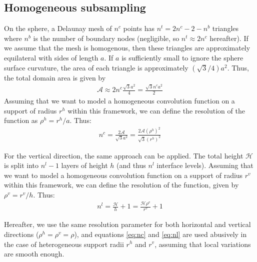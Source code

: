 \documentclass[12pt]{scrartcl}
\begin{document}
\subsection{Homogeneous subsampling}
On the sphere, a Delaunay mesh of $n^c$ points has $n^t = 2n^c-2-n^b$ triangles where $n^b$ is the number of boundary nodes (negligible, so $n^t \approx 2 n^c$ hereafter). If we assume that the mesh is homogenous, then these triangles are approximately equilateral with sides of length $a$. If $a$ is sufficiently small to ignore the sphere surface curvature, the area of each triangle is approximately $(\sqrt{3}/4)a^2$. Thus, the total domain area is given by
\begin{align}
\mathcal{A} \approx 2 n^c \frac{\sqrt{3}a^2}{4} = \frac{\sqrt{3}n^c a^2}{2}
\end{align}
Assuming that we want to model a homogeneous convolution function on a support of radius $r^h$ within this framework, we can define the resolution of the function as $\rho^h = r^h/a$. Thus:
\begin{align}
\label{eq:nc}
n^c = \frac{2 \mathcal{A}}{\sqrt{3}  a^2} = \frac{2 \mathcal{A} \left(\rho^h\right)^2}{\sqrt{3} \left(r^h\right)^2}
\end{align}

For the vertical direction, the same approach can be applied. The total height $\mathcal{H}$ is split into $n^l-1$ layers of height $h$ (and thus $n^l$ interface levels). Assuming that we want to model a homogeneous convolution function on a support of radius $r^v$ within this framework, we can define the resolution of the function, given by $\rho^v = r^v/h$. Thus:
\begin{align}
\label{eq:nl}
n^l = \frac{\mathcal{H}}{h}+1 = \frac{\mathcal{H} \rho^v}{r^v}+1
\end{align}

Hereafter, we use the same resolution parameter for both horizontal and vertical directions ($\rho^h = \rho^v = \rho$), and equations \ref{eq:nc} and \ref{eq:nl} are used abusively in the case of heterogeneous support radii $r^h$ and $r^v$, assuming that local variations are smooth enough.
\end{document}

